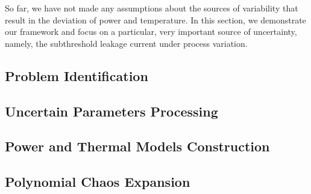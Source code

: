 So far, we have not made any assumptions about the sources of variability that result in the deviation of power and temperature. In this section, we demonstrate our framework and focus on a particular, very important source of uncertainty, namely, the subthreshold leakage current under process variation.

\subsection{Problem Identification} 


\subsection{Uncertain Parameters Processing} 


\subsection{Power and Thermal Models Construction}  


\subsection{Polynomial Chaos Expansion} 

